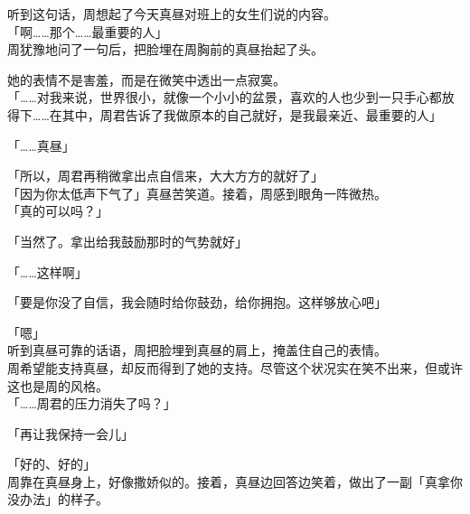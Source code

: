 听到这句话，周想起了今天真昼对班上的女生们说的内容。\\

「啊……那个……最重要的人」\\

周犹豫地问了一句后，把脸埋在周胸前的真昼抬起了头。

她的表情不是害羞，而是在微笑中透出一点寂寞。\\

「……对我来说，世界很小，就像一个小小的盆景，喜欢的人也少到一只手心都放得下……在其中，周君告诉了我做原本的自己就好，是我最亲近、最重要的人」

「……真昼」

「所以，周君再稍微拿出点自信来，大大方方的就好了」\\

「因为你太低声下气了」真昼苦笑道。接着，周感到眼角一阵微热。\\

「真的可以吗？」

「当然了。拿出给我鼓励那时的气势就好」

「……这样啊」

「要是你没了自信，我会随时给你鼓劲，给你拥抱。这样够放心吧」

「嗯」\\

听到真昼可靠的话语，周把脸埋到真昼的肩上，掩盖住自己的表情。\\

周希望能支持真昼，却反而得到了她的支持。尽管这个状况实在笑不出来，但或许这也是周的风格。\\

「……周君的压力消失了吗？」

「再让我保持一会儿」

「好的、好的」\\

周靠在真昼身上，好像撒娇似的。接着，真昼边回答边笑着，做出了一副「真拿你没办法」的样子。
